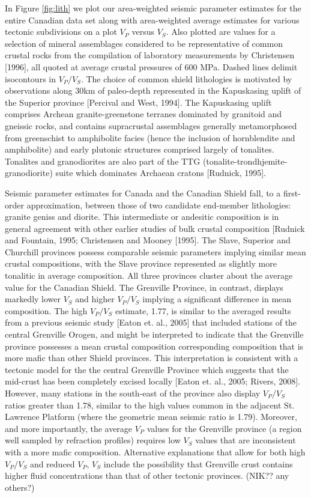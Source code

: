 \documentclass[draft, 12pt]{article}
\begin{document}
In Figure \ref{fig:lith} we plot our area-weighted seismic parameter estimates for the entire Canadian data set along with area-weighted average estimates for various tectonic subdivisions on a plot $V_P$ versus $V_S$. Also plotted are values for a selection of mineral assemblages considered to be representative of common crustal rocks from the compilation of laboratory measurements by Christensen [1996], all quoted at average crustal pressures of 600 MPa. Dashed lines delimit isocontours in $V_P/V_S$. The choice of common shield lithologies is motivated by observations along 30km of paleo-depth represented in the Kapuskasing uplift of the Superior province [Percival and West, 1994]. The Kapuskasing uplift comprises Archean granite-greenstone terranes dominated by granitoid and gneissic rocks, and contains supracrustal assemblages generally metamorphosed from greenschist to amphibolite facies (hence the inclusion of hornblendite and amphibolite) and early plutonic structures comprised largely of tonalites. Tonalites and granodiorites are also part of the TTG (tonalite-trondhjemite-granodiorite) suite which dominates Archaean cratons [Rudnick, 1995].

Seismic parameter estimates for Canada and the Canadian Shield fall, to a first-order approximation, between those of two candidate end-member lithologies: granite geniss and diorite. This intermediate or andesitic composition is in general agreement with other earlier studies of bulk crustal composition [Rudnick and Fountain, 1995; Christensen and Mooney [1995]. The Slave, Superior and Churchill provinces possess comparable seismic parameters implying similar mean crustal compositions, with the Slave province represented as slightly more tonalitic in average composition. All three provinces cluster about the average value for the Canadian Shield. The Grenville Province, in contrast, displays markedly lower $V_S$ and higher $V_P/V_S$ implying a significant difference in mean composition. The high $V_P/V_S$ estimate, 1.77, is similar to the averaged results from a previous seismic study [Eaton et. al., 2005] that included stations of the central Grenville Orogen, and might be interpreted to indicate that the Grenville province possesses a mean crustal composition corresponding composition that is more mafic than other Shield provinces. This interpretation is consistent with a tectonic model for the the central Grenville Province which suggests that the mid-crust has been completely excised locally [Eaton et. al., 2005; Rivers, 2008]. However, many stations in the south-east of the province also display $V_P/V_S$ ratios greater than 1.78, similar to the high values common in the adjacent St. Lawrence Platform (where the geometric mean seismic ratio is 1.79). Moreover, and more importantly, the average $V_P$ values for the Grenville province (a region well sampled by refraction profiles) requires low $V_S$ values that are inconsistent with a more mafic composition. Alternative explanations that allow for both high $V_P/V_S$ and reduced $V_P$, $V_S$ include the possibility that Grenville crust contains higher fluid concentrations than that of other tectonic provinces. (NIK?? any others?)
\end{document}
